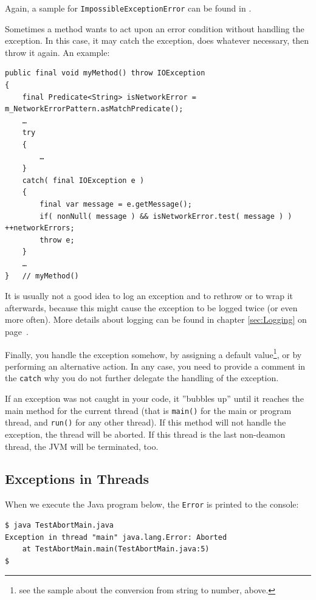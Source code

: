\documentclass[11pt,a4paper, titlepage, parskip=half, headsepline, footsepline, cleardoublepage=current, headheight=1cm]{scrbook}
\newcommand*{\tqvref}[1]{\hyperref[{#1}]{\ref*{#1}} on page~\pageref{#1}}
\begin{document}
Again, a sample for \lstinline|ImpossibleExceptionError| can be found in \autocite{TQUADRAT_ORG_FOUNDATION_IMPOSSIBLEEXCEPTIONERROR}.

Sometimes a method wants to act upon an error condition without handling the exception. In this case, it may catch the exception, does whatever necessary, then throw it again. An example:
\begin{lstlisting}
public final void myMethod() throw IOException
{
    final Predicate<String> isNetworkError = m_NetworkErrorPattern.asMatchPredicate();
    …
    try
    {
        …
    }
    catch( final IOException e )
    {
        final var message = e.getMessage();
        if( nonNull( message ) && isNetworkError.test( message ) ) ++networkErrors;
        throw e;
    }
    …
}   // myMethod()
\end{lstlisting}

It is usually not a good idea to log an exception and to rethrow or to wrap it afterwards, because this might cause the exception to be logged twice (or even more often). More details about logging can be found in chapter \tqvref{sec:Logging}.

Finally, you handle the exception somehow, by assigning a default value\footnote{see the sample about the conversion from string to number, above.}, or by performing an alternative action. In any case, you need to provide a comment in the \lstinline|catch| why you do not further delegate the handling of the exception.

If an exception was not caught in your code, it ”bubbles up” until it reaches the main method for the current thread (that is \lstinline|main()| for the main or program thread, and \lstinline|run()|\autocite{ORACLE_DOC_RUNNABLE:run} for any other thread). If this method will not handle the exception, the thread will be aborted. If this thread is the last non-deamon thread, the JVM will be terminated, too.


\subsection{Exceptions in Threads}\label{sec:ExceptionHandlingInThreads}
When we execute the Java program below, the \lstinline|Error| is printed to the console:


\begin{verbatim}
$ java TestAbortMain.java
Exception in thread "main" java.lang.Error: Aborted
    at TestAbortMain.main(TestAbortMain.java:5)
$ 
\end{verbatim}
\end{document}
